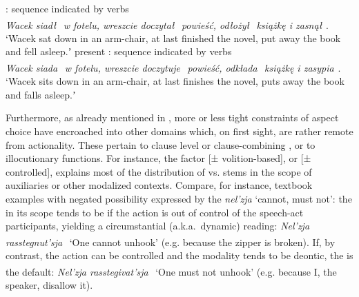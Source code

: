 \documentclass[output=paper]{langsci/langscibook}
\begin{document}
\ea\label{ex:wiemerserzant:7}
\ea 
{}: sequence indicated by  verbs \\
\textit{Wacek siadł}{\textsuperscript{~}\PFV} \textit{w fotelu, wreszcie doczytał}{\textsuperscript{~}\PFV} \textit{powieść, odłożył}{\textsuperscript{~}\PFV} \textit{książkę i zasnął}{\textsuperscript{~}\PFV}. \\
‘Wacek sat down in an arm-chair, at last finished{\rmfnm} the novel, put away the book and fell asleep.ʼ
\newpage\ex 
present : sequence indicated by  verbs\\
\textit{Wacek siada}{\textsuperscript{~}\IPFV} \textit{w fo}\textit{telu, wreszcie doczytuje}{\textsuperscript{~}\IPFV} \textit{powieść, odkłada}{\textsuperscript{~}\IPFV} \textit{książkę i zasypia}{\textsuperscript{~}\IPFV}.\\
‘Wacek sits down in an arm-chair, at last finishes the novel, puts away the book and falls asleep.ʼ
\z 
\z 
{}

Furthermore, as already mentioned in , more or less tight constraints of aspect choice have encroached into other domains which, on first sight, are rather remote from actionality. These pertain to clause level or clause-combining , or to illocutionary functions. For instance, the factor [± volition-based], or [± controlled], explains most of the distribution of  vs.  stems in the scope of  auxiliaries or other modalized contexts. Compare, for instance,  textbook examples with negated possibility expressed by the  \textit{nel’zja} ‘cannot, must not’: the  in its scope tends to be  if the action is out of control of the speech-act participants, yielding a circumstantial (a.k.a.\ dynamic) reading: \textit{Nel’zja rasstegnut’sja}{\textsuperscript{~}\PFV} ‘One cannot unhook’ (e.g. because the zipper is broken). If, by contrast, the action can be controlled and the modality tends to be deontic, the   is the default: \textit{Nel’zja rasstegivat’sja}{\textsuperscript{~}\IPFV} ‘One must not unhook’ (e.g. because I, the speaker, disallow it).
\end{document}
